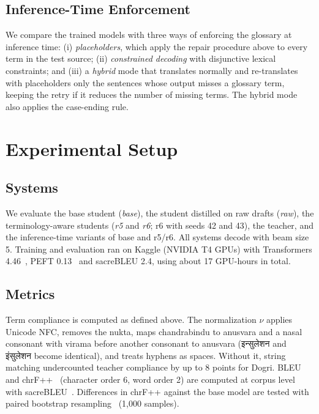 \documentclass[conference]{IEEEtran}
\newcommand{\dev}[1]{{\devfont #1}}
\begin{document}
\subsection{Inference-Time Enforcement}
We compare the trained models with three ways of enforcing the glossary at inference time: (i) \emph{placeholders}, which apply the repair procedure above to every term in the test source; (ii) \emph{constrained decoding} with disjunctive lexical constraints; and (iii) a \emph{hybrid} mode that translates normally and re-translates with placeholders only the sentences whose output misses a glossary term, keeping the retry if it reduces the number of missing terms. The hybrid mode also applies the case-ending rule.

\section{Experimental Setup}
\label{sec:setup}

\subsection{Systems}
We evaluate the base student (\emph{base}), the student distilled on raw drafts (\emph{raw}), the terminology-aware students (\emph{r5} and \emph{r6}; r6 with seeds 42 and 43), the teacher, and the inference-time variants of base and r5/r6. All systems decode with beam size 5. Training and evaluation ran on Kaggle (NVIDIA T4 GPUs) with Transformers 4.46~\cite{wolf2020transformers}, PEFT 0.13~\cite{peft} and sacreBLEU 2.4, using about 17 GPU-hours in total.

\subsection{Metrics}
\label{sec:metrics}
Term compliance is computed as defined above. The normalization $\nu$ applies Unicode NFC, removes the nukta, maps chandrabindu to anusvara and a nasal consonant with virama before another consonant to anusvara (\dev{इन्सुलेशन} and \dev{इंसुलेशन} become identical), and treats hyphens as spaces. Without it, string matching undercounted teacher compliance by up to 8 points for Dogri. BLEU~\cite{papineni2002bleu} and chrF++~\cite{popovic2015chrf,popovic2017chrf} (character order 6, word order 2) are computed at corpus level with sacreBLEU~\cite{post2018call}. Differences in chrF++ against the base model are tested with paired bootstrap resampling~\cite{koehn2004statistical} (1,000 samples).
\end{document}
